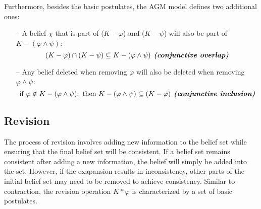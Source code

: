 Furthermore, besides the basic postulates, the AGM model defines two additional ones:

\begin{enumerate}
    \item [--] A belief $\chi$ that is part of ($K - \varphi$) and ($K - \psi$) will also be part of $K - (\varphi \wedge \psi)$:
    $$(K - \varphi) \cap (K - \psi) \subseteq K-(\varphi \wedge \psi) \textbf{\textit{ (conjunctive overlap)}}$$

    \item [--] Any belief deleted when removing $\varphi$ will also be deleted when removing $\varphi \wedge \psi$:
    $$\text{if } \varphi \notin K - (\varphi \wedge \psi), \text{ then } K - (\varphi \wedge \psi) \subseteq (K - \varphi) \textbf{\textit{ (conjunctive inclusion)}}$$
\end{enumerate}

\subsection{Revision}
\label{subsec:revision}

The process of revision involves adding new information to the belief set while ensuring that the final belief set will be consistent. If a belief set remains consistent after adding a new information, the belief will simply be added into the set. However, if the exapansion results in inconsistency, other parts of the initial belief set may need to be removed to achieve consistency. Similar to contraction, the revision operation $K * \varphi$ is characterized by a set of basic postulates.

